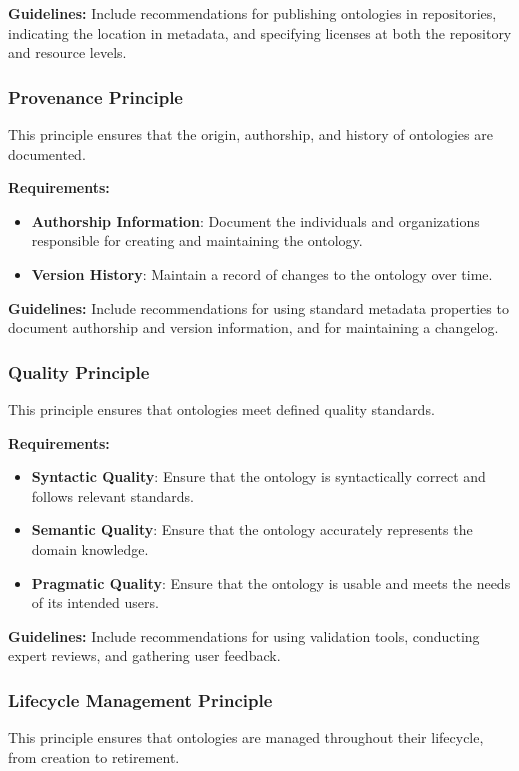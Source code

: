 \documentclass[conference]{IEEEtran}
\begin{document}
\textbf{Guidelines:} Include recommendations for publishing ontologies in repositories, indicating the location in metadata, and specifying licenses at both the repository and resource levels.

\subsubsection{Provenance Principle}
This principle ensures that the origin, authorship, and history of ontologies are documented.

\textbf{Requirements:}
\begin{itemize}
    \item \textbf{Authorship Information}: Document the individuals and organizations responsible for creating and maintaining the ontology.
    \item \textbf{Version History}: Maintain a record of changes to the ontology over time.
\end{itemize}

\textbf{Guidelines:} Include recommendations for using standard metadata properties to document authorship and version information, and for maintaining a changelog.

\subsubsection{Quality Principle}
This principle ensures that ontologies meet defined quality standards.

\textbf{Requirements:}
\begin{itemize}
    \item \textbf{Syntactic Quality}: Ensure that the ontology is syntactically correct and follows relevant standards.
    \item \textbf{Semantic Quality}: Ensure that the ontology accurately represents the domain knowledge.
    \item \textbf{Pragmatic Quality}: Ensure that the ontology is usable and meets the needs of its intended users.
\end{itemize}

\textbf{Guidelines:} Include recommendations for using validation tools, conducting expert reviews, and gathering user feedback.

\subsubsection{Lifecycle Management Principle}
This principle ensures that ontologies are managed throughout their lifecycle, from creation to retirement.
\end{document}
